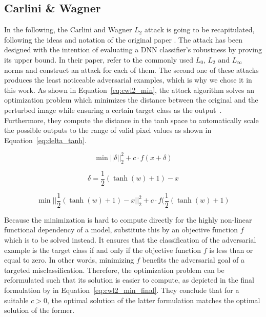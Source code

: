 \subsection{Carlini \& Wagner}\label{subsec:cwl2}
In the following, the Carlini and Wagner $L_2$ attack is going to be recapitulated, following the ideas and notation of the original paper \cite{carlini2017towards}.
The attack has been designed with the intention of evaluating a DNN classifier's robustness by proving its upper bound.
In their paper, \citeauthor{carlini2017towards} refer to the commonly used $L_0$, $L_2$ and $L_\infty$ norms and construct an attack for each of them.
The second one of these attacks produces the least noticeable adversarial examples, which is why we chose it in this work.
As shown in Equation~\ref{eq:cwl2_min}, the attack algorithm solves an optimization problem which minimizes the distance between the original and the perturbed image while ensuring a certain target class as the output~\cite{carlini2017towards}.
Furthermore, they compute the distance in the tanh space to automatically scale the possible outputs to the range of valid pixel values as shown in Equation~\ref{eq:delta_tanh}.

\begin{equation}\label{eq:cwl2_min}
\min ||\delta||^2_2 + c \cdot f(x + \delta)
\end{equation}

\begin{equation}\label{eq:delta_tanh}
\delta = \frac{1}{2}(\tanh(w)+1) - x
\end{equation}

\begin{equation}\label{eq:cwl2_min_final}
\min ||\frac{1}{2}(\tanh(w)+1)-x||^2_2 + c \cdot f(\frac{1}{2}(\tanh(w)+1)
\end{equation}

Because the minimization is hard to compute directly for the highly non-linear functional dependency of a model, \citeauthor{carlini2017towards} substitute this by an objective function $f$ which is to be solved instead.
It ensures that the classification of the adversarial example is the target class if and only if the objective function $f$ is less than or equal to zero.
In other words, minimizing $f$ benefits the adversarial goal of a targeted misclassification.
Therefore, the optimization problem can be reformulated such that its solution is easier to compute, as depicted in the final formulation by \citeauthor{carlini2017towards} in Equation~\ref{eq:cwl2_min_final}.
They conclude that for a suitable $c > 0$, the optimal solution of the latter formulation matches the optimal solution of the former.

